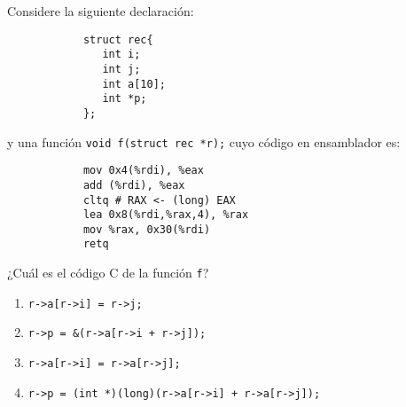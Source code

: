 \documentclass[12pt]{article}
\begin{document}
    \begin{ejercicio}
        Considere la siguiente declaración:
        \begin{verbatim}
            struct rec{
               int i;
               int j;
               int a[10];
               int *p;
            };
        \end{verbatim}
        y una función \verb|void f(struct rec *r);| cuyo código en ensamblador es:
        \begin{verbatim}
            mov 0x4(%rdi), %eax
            add (%rdi), %eax
            cltq # RAX <- (long) EAX
            lea 0x8(%rdi,%rax,4), %rax
            mov %rax, 0x30(%rdi)
            retq
        \end{verbatim}
        ¿Cuál es el código C de la función \verb|f|?
        \begin{enumerate}[label=\alph*)]
            \item \verb|r->a[r->i] = r->j;|
            \item \verb|r->p = &(r->a[r->i + r->j]);|
            \item \verb|r->a[r->i] = r->a[r->j];|
            \item \verb|r->p = (int *)(long)(r->a[r->i] + r->a[r->j]);|
        \end{enumerate}
    \end{ejercicio}
\end{document}
